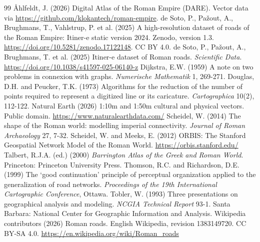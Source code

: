 \documentclass[11pt,a4paper]{article}
\begin{document}
\begin{thebibliography}{99}
 {\AA}hlfeldt, J. (2026) Digital Atlas of the Roman Empire (DARE). Vector data via \url{https://github.com/klokantech/roman-empire}.
 de Soto, P., Pa\v{z}out, A., Brughmans, T., Vahlstrup, P. et al. (2025) A high-resolution dataset of roads of the Roman Empire: Itiner-e static version 2024. Zenodo, version 1.3. \url{https://doi.org/10.5281/zenodo.17122148}. CC BY 4.0.
 de Soto, P., Pa\v{z}out, A., Brughmans, T. et al. (2025) Itiner-e dataset of Roman roads. \emph{Scientific Data}. \url{https://doi.org/10.1038/s41597-025-06140-z}
 Dijkstra, E.W. (1959) A note on two problems in connexion with graphs. \emph{Numerische Mathematik} 1, 269-271.
 Douglas, D.H. and Peucker, T.K. (1973) Algorithms for the reduction of the number of points required to represent a digitized line or its caricature. \emph{Cartographica} 10(2), 112-122.
 Natural Earth (2026) 1:10m and 1:50m cultural and physical vectors. Public domain. \url{https://www.naturalearthdata.com/}
 Scheidel, W. (2014) The shape of the Roman world: modelling imperial connectivity. \emph{Journal of Roman Archaeology} 27, 7-32.
 Scheidel, W. and Meeks, E. (2012) ORBIS: The Stanford Geospatial Network Model of the Roman World. \url{https://orbis.stanford.edu/}
 Talbert, R.J.A. (ed.) (2000) \emph{Barrington Atlas of the Greek and Roman World}. Princeton: Princeton University Press.
 Thomson, R.C. and Richardson, D.E. (1999) The `good continuation' principle of perceptual organization applied to the generalization of road networks. \emph{Proceedings of the 19th International Cartographic Conference}, Ottawa.
 Tobler, W. (1993) Three presentations on geographical analysis and modeling. \emph{NCGIA Technical Report} 93-1. Santa Barbara: National Center for Geographic Information and Analysis.
 Wikipedia contributors (2026) Roman roads. English Wikipedia, revision 1383149720. CC BY-SA 4.0. \url{https://en.wikipedia.org/wiki/Roman_roads}
\end{thebibliography}
\end{document}
